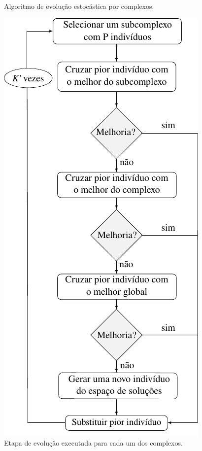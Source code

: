 \begin{figure}
\begin{minipage}[b]{0.42\textwidth}
    \caption{Algoritmo de evolução estocástica por complexos.}
    \label{img:flow1}
  \end{minipage}
  \hfill
  \begin{minipage}[b]{0.42\textwidth}
    \includegraphics[width=\textwidth]{img/sce/flow2}
    \caption{Etapa de evolução executada para cada um dos complexos.}
    \label{img:flow2}
  \end{minipage}
\end{figure}

